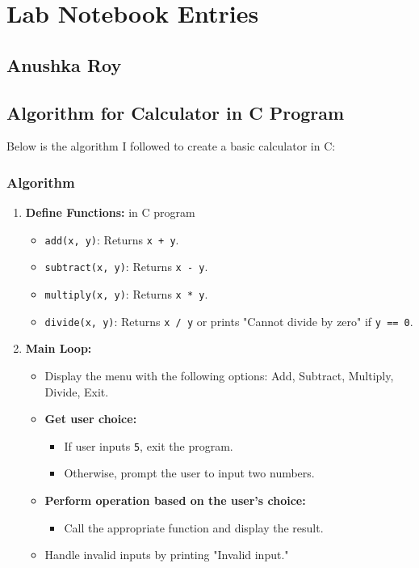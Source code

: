 \documentclass{article}
\begin{document}
\newpage
\section*{Lab Notebook Entries}
\subsection*{Anushka Roy}
\subsection{Algorithm for Calculator in C Program}

Below is the algorithm I followed to create a basic calculator in C:

\subsubsection*{Algorithm}

\begin{enumerate}
    \item \textbf{Define Functions:} in C program
    \begin{itemize}
        \item \texttt{add(x, y)}: Returns \texttt{x + y}.
        \item \texttt{subtract(x, y)}: Returns \texttt{x - y}.
        \item \texttt{multiply(x, y)}: Returns \texttt{x * y}.
        \item \texttt{divide(x, y)}: Returns \texttt{x / y} or prints "Cannot divide by zero" if \texttt{y == 0}.
    \end{itemize}
    
    \item \textbf{Main Loop:}
    \begin{itemize}
        \item Display the menu with the following options: Add, Subtract, Multiply, Divide, Exit.
        \item \textbf{Get user choice:}
        \begin{itemize}
            \item If user inputs \texttt{5}, exit the program.
            \item Otherwise, prompt the user to input two numbers.
        \end{itemize}
        \item \textbf{Perform operation based on the user's choice:}
        \begin{itemize}
            \item Call the appropriate function and display the result.
        \end{itemize}
        \item Handle invalid inputs by printing "Invalid input."
    \end{itemize}
\end{enumerate}
\end{document}
